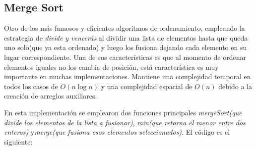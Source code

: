 \documentclass[12pt, a4paper]{article}
\begin{document}
            \subsection{Merge Sort}
                Otro de los más famosos y eficientes algoritmos de ordenamiento, empleando la estrategia de \textit{divide y vencerás} al dividir una lista de elementos hasta que queda uno solo(que ya esta ordenado) y luego los fusiona dejando cada elemento en su lugar correspondiente. Una de sus características es que al momento de ordenar elementos iguales no los cambia de posición, está característica es muy importante en muchas implementaciones. Mantiene una complejidad temporal en todos los casos de $O(n\log n)$ y una complejidad espacial de $O(n)$ debido a la creación de arreglos auxiliares.
                
                En esta implementación se emplearon dos funciones principales \textit{mergeSort(que divide los elementos de la lista a fusionar)}, \textit{min(que retorna el menor entre dos enteros)} y\textit{merge(que fusiona esos elementos seleccionados)}. El código es el siguiente:
                \newpage
\end{document}
